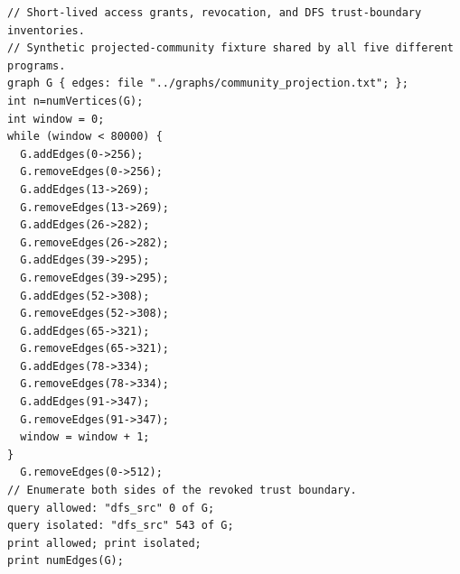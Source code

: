 \documentclass[10pt,a4paper]{article}
\begin{document}
\clearpage

\begin{lstlisting}[caption={Trust audit},label={lst:trust-audit}]
// Short-lived access grants, revocation, and DFS trust-boundary inventories.
// Synthetic projected-community fixture shared by all five different programs.
graph G { edges: file "../graphs/community_projection.txt"; };
int n=numVertices(G);
int window = 0;
while (window < 80000) {
  G.addEdges(0->256);
  G.removeEdges(0->256);
  G.addEdges(13->269);
  G.removeEdges(13->269);
  G.addEdges(26->282);
  G.removeEdges(26->282);
  G.addEdges(39->295);
  G.removeEdges(39->295);
  G.addEdges(52->308);
  G.removeEdges(52->308);
  G.addEdges(65->321);
  G.removeEdges(65->321);
  G.addEdges(78->334);
  G.removeEdges(78->334);
  G.addEdges(91->347);
  G.removeEdges(91->347);
  window = window + 1;
}
  G.removeEdges(0->512);
// Enumerate both sides of the revoked trust boundary.
query allowed: "dfs_src" 0 of G;
query isolated: "dfs_src" 543 of G;
print allowed; print isolated;
print numEdges(G);
\end{lstlisting}
\end{document}
